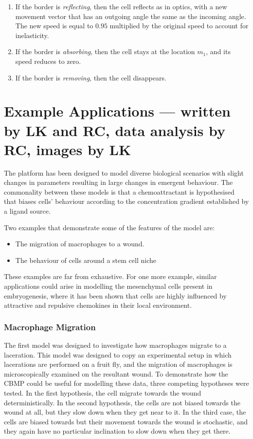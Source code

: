 \documentclass[12pt]{article}
\begin{document}
\begin{enumerate}
  \item If the border is {\itshape reflecting}, then the cell reflects as in optics, 
with a new movement vector that has an outgoing angle the same as the 
incoming angle. The new speed is equal to \(0.95\) multiplied by the original speed
to account for inelasticity.
\item If the border is {\itshape absorbing}, then the cell stays at the location \(m_1\), 
  and its speed reduces to zero.
\item If the border is {\itshape removing}, then the cell disappears.
\end{enumerate}

\section{Example Applications --- written by LK and RC, data analysis by RC, images by LK}
The platform has been designed to model diverse biological scenarios with 
slight changes in parameters resulting in large changes in emergent 
behaviour. The commonality between these models is that a 
chemoattractant is hypothesised that biases cells' behaviour according 
to the concentration gradient established by a ligand source.

Two examples that demonstrate some of the features of the model are:

\begin{itemize}
\item The migration of macrophages to a wound.
\item The behaviour of cells around a stem cell niche
\end{itemize}

These examples are far from exhaustive. For one more example, similar 
applications could arise in modelling the mesenchymal cells present in 
embryogenesis,\cite{caplan91}\cite{merks05} where it has been shown that cells are highly influenced 
by attractive and repulsive chemokines in their local environment.

\subsubsection{Macrophage Migration}
The first model was designed to investigate how macrophages migrate to a 
laceration. This model was designed to copy an experimental setup in 
which lacerations are performed on a fruit fly, and the migration of 
macrophages is microscopically examined on the resultant wound. 
To 
demonstrate how the CBMP could be useful for modelling these data, three 
competing hypotheses were tested. In the first hypothesis, the cell 
migrate towards the wound deterministically. In the second hypothesis, 
the cells are not biased towards the wound at all, but they slow down 
when they get near to it. In the third case, the cells are biased 
towards but their movement towards the wound is stochastic, and they 
again have no particular inclination to slow down when they get there.
\end{document}
